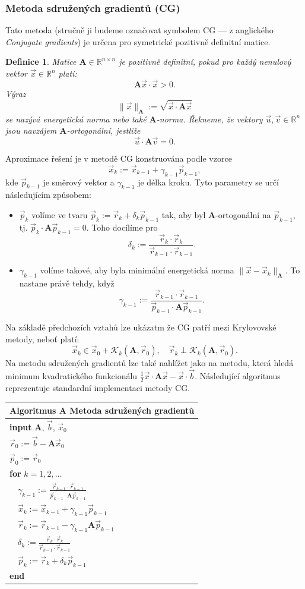 \documentclass{article}
\newtheorem{df}{Definice}
\newcommand{\0}{\vec{0}}
\newcommand{\A}{\mat A}
\newcommand{\algoritmus}[2]{\vspace{2mm}\begin{tabular}{l}
\hline
{\bf Algoritmus A\arabic{algocntr}} #1\\
\hline
#2\\
\hline
\end{tabular}\vspace{2mm}
\addtocounter{algocntr}{1}}
\newcommand{\bb}{\vec{b}}
\newcommand{\mat}[1]{\mathbf{#1}}
\newcommand{\norm}[1]{\|#1\|}
\newcommand{\pp}{\vec{p}}
\newcommand{\R}{\mathbb R}
\newcommand{\rr}{\vec{r}}
\newcommand{\uu}{\vec{u}}
\newcommand{\vv}{\vec{v}}
\newcommand{\xx}{\vec{x}}
\newcounter{algocntr}
\begin{document}
\subsubsection{Metoda sdružených gradientů (CG)}
\label{sec:cg}

Tato metoda (stručně ji budeme označovat symbolem CG --- z anglického \emph{Conjugate gradients}) je určena pro symetrické pozitivně definitní matice.
\begin{df}
Matice $\A\in\R^{n\times n}$ je pozitivně definitní, pokud pro každý nenulový vektor $\xx\in\R^n$ platí:
$$ \A\xx\cdot\xx>0. $$
Výraz
$$ \norm{\xx}_\A:=\sqrt{\xx\cdot\A\xx} $$
se nazývá energetická norma nebo také $\A$-norma.
Řekneme, že vektory $\uu,\vv\in\R^n$ jsou navzájem $\A$-ortogonální, jestliže
$$ \uu\cdot\A\vv=0. $$
\end{df}
Aproximace řešení je v metodě CG konstruována podle vzorce
$$ \xx_k:=\xx_{k-1}+\gamma_{k-1}\pp_{k-1}, $$
kde $\pp_{k-1}$ je směrový vektor a $\gamma_{k-1}$ je délka kroku.
Tyto parametry se určí následujícím způsobem:
\begin{itemize}
\item $\pp_k$ volíme ve tvaru $\pp_k:=\rr_k+\delta_k\pp_{k-1}$ tak, aby byl $\A$-ortogonální na $\pp_{k-1}$, tj. $\pp_k\cdot\A\pp_{k-1}=0$. Toho docílíme pro
$$ \delta_k:=\frac{\rr_k\cdot\rr_k}{\rr_{k-1}\cdot\rr_{k-1}}. $$
\item $\gamma_{k-1}$ volíme takové, aby byla minimální energetická norma $\norm{\xx-\xx_k}_\A$. To nastane právě tehdy, když
$$ \gamma_{k-1}:=\frac{\rr_{k-1}\cdot\rr_{k-1}}{\pp_{k-1}\cdot\A\pp_{k-1}}. $$
\end{itemize}
Na základě předchozích vztahů lze ukázatm že CG patří mezi Krylovovské metody, neboť platí:
$$ \xx_k\in\xx_0+\mathcal K_k(\A,\rr_0),\quad \rr_k\perp\mathcal K_k(\A,\rr_0). $$
Na metodu sdružených gradientů lze také nahlížet jako na metodu, která hledá mi\-ni\-mum kvadratického funkcionálu $\frac12\xx\cdot\A\xx-\xx\cdot\bb$.
Následující algoritmus reprezentuje standardní implementaci metody CG.

\algoritmus{Metoda sdružených gradientů}{
{\bf input} $\A$, $\bb$, $\xx_0$\\
$\rr_0:=\bb-\A\xx_0$\\
$\pp_0:=\rr_0$\\
{\bf for }$k=1,2,\ldots$\\
$\quad \gamma_{k-1}:=\frac{\rr_{k-1}\cdot\rr_{k-1}}{\pp_{k-1}\cdot\A\pp_{k-1}}$\\
$\quad \xx_k:=\xx_{k-1}+\gamma_{k-1}\pp_{k-1}$\\
$\quad \rr_k:=\rr_{k-1}-\gamma_{k-1}\A\pp_{k-1}$\\
$\quad \delta_k:=\frac{\rr_k\cdot\rr_k}{\rr_{k-1}\cdot\rr_{k-1}}$\\
$\quad \pp_k:=\rr_k+\delta_k\pp_{k-1}$\\
{\bf end}
}
\end{document}
